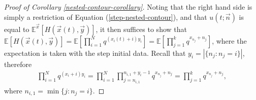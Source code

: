 \begin{proof}[Proof of Corollary \ref{nested-contour-corollary}]
Noting that the right hand side is simply a restriction of Equation (\ref{step-nested-contour}), and that $u(t;\vec{n})$ is equal to $\mathbb{E}^{\vec{x}}[H(\vec{x}(t), \vec{y})]$, it then suffices to show that $\mathbb{E}[H(\vec{x}(t), \vec{y})] =\mathbb{E} \left[ \prod_{i=1}^N q^{(x_i(t) + i) y_i} \right]= \mathbb{E} \left[ \prod_{j=1}^k q^{x_{n_j}+n_j} \right]$, where the expectation is taken with the step initial data. Recall that $y_i = |\{n_j: n_j = i\}|$, therefore
\begin{align*}
\prod_{i=1}^N q^{(x_i + i) y_i} = \prod_{i=1}^{N} \prod_{j=n_{i,1}}^{n_{i,1}+y_i-1} q^{x_{n_j} + n_j} = \prod_{j=1}^k q^{x_{n_j}+n_j},
\end{align*}
where $n_{i,1} = \min \{j : n_j = i\}$.
\end{proof}

